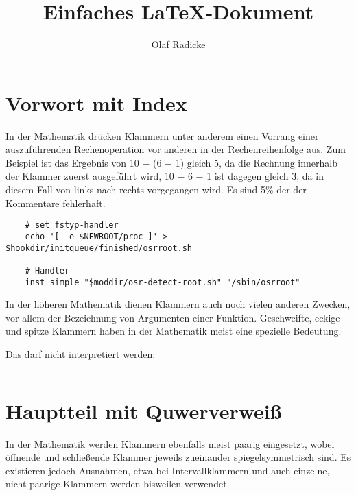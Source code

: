 \documentclass[10pt,a4paper]{article}
\author{Olaf Radicke}
\title{Einfaches LaTeX-Dokument}
\begin{document}

\maketitle

\newpage

\tableofcontents

\newpage

\section {Vorwort mit Index}

In der Mathematik drücken Klammern unter anderem einen Vorrang einer
auszuführenden Rechenoperation vor anderen in der Rechenreihenfolge aus. Zum
Beispiel ist das Ergebnis von 10 − (6 − 1) gleich 5, da
die Rechnung innerhalb %
der Klammer zuerst ausgeführt wird, 10 − 6 − 1 ist dagegen gleich 3, da in
diesem Fall von links nach rechts vorgegangen wird.
Es sind 5\% der der Kommentare fehlerhaft.

\begin{lstlisting}
    # set fstyp-handler
    echo '[ -e $NEWROOT/proc ]' > $hookdir/initqueue/finished/osrroot.sh

    # Handler
    inst_simple "$moddir/osr-detect-root.sh" "/sbin/osrroot"
\end{lstlisting}


In der höheren Mathematik
dienen Klammern auch noch vielen anderen Zwecken, vor allem der Bezeichnung
von Argumenten einer Funktion. Geschweifte, eckige und spitze Klammern haben
in der Mathematik meist eine spezielle Bedeutung.

Das darf nicht interpretiert werden:
\begin{verbatim}

\end{verbatim} 



%

\section{Hauptteil mit Quwerverweiß}

In der Mathematik werden Klammern ebenfalls meist paarig eingesetzt, wobei
öffnende und schließende Klammer jeweils zueinander spiegelsymmetrisch sind.
Es existieren jedoch Ausnahmen, etwa bei Intervallklammern und auch einzelne,
nicht paarige Klammern werden bisweilen verwendet.
\end{document}
